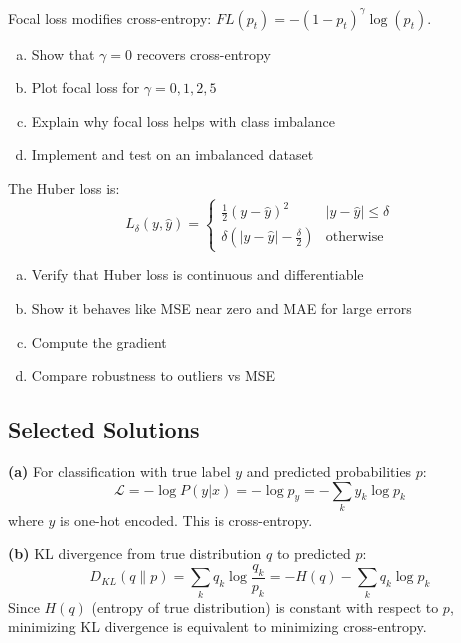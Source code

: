 \documentclass[../main.tex]{subfiles}
\begin{document}
\begin{simpleexercise}
Focal loss modifies cross-entropy: $FL(p_t) = -(1 - p_t)^\gamma \log(p_t)$.
\begin{enumerate}[(a)]
    \item Show that $\gamma = 0$ recovers cross-entropy
    \item Plot focal loss for $\gamma = 0, 1, 2, 5$
    \item Explain why focal loss helps with class imbalance
    \item Implement and test on an imbalanced dataset
\end{enumerate}
\end{simpleexercise}

\begin{simpleexercise}
The Huber loss is:
\[
L_\delta(y, \hat{y}) = \begin{cases}
\frac{1}{2}(y - \hat{y})^2 & |y - \hat{y}| \leq \delta \\
\delta(|y - \hat{y}| - \frac{\delta}{2}) & \text{otherwise}
\end{cases}
\]
\begin{enumerate}[(a)]
    \item Verify that Huber loss is continuous and differentiable
    \item Show it behaves like MSE near zero and MAE for large errors
    \item Compute the gradient
    \item Compare robustness to outliers vs MSE
\end{enumerate}
\end{simpleexercise}

\subsection{Selected Solutions}

\begin{solution}[Exercise 6.1(a,b)]
\textbf{(a)} For classification with true label $y$ and predicted probabilities $p$:
\[
\mathcal{L} = -\log P(y | x) = -\log p_y = -\sum_{k} y_k \log p_k
\]
where $y$ is one-hot encoded. This is cross-entropy.

\textbf{(b)} KL divergence from true distribution $q$ to predicted $p$:
\[
D_{KL}(q \| p) = \sum_k q_k \log \frac{q_k}{p_k} = -H(q) - \sum_k q_k \log p_k
\]
Since $H(q)$ (entropy of true distribution) is constant with respect to $p$, minimizing KL divergence is equivalent to minimizing cross-entropy.
\end{solution}
\end{document}
